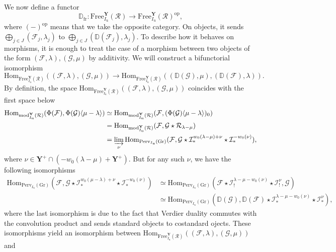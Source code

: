 \documentclass[11pt]{amsart}
\theoremstyle{plain}
\theoremstyle{remark}
\numberwithin{equation}{section}
\begin{document}
	We now define a functor 
	$$\mathbb{D}_{\mathrm{fr}}:\mathrm{Free}^\mathbf{Y}_{I_\mathrm{u}}(\mathcal{R})\to \mathrm{Free}^\mathbf{Y}_{I_\mathrm{u}}(\mathcal{R})^\mathrm{op},$$
 where $(-)^\mathrm{op}$ means that we take the opposite category. On objects, it sends $\bigoplus_{j\in J} (\mathcal{F}_j,\lambda_j)$ to $\bigoplus_{j\in J} (\mathbb{D}(\mathcal{F}_j),\lambda_j)$. To describe how it behaves on morphisms, it is enough to treat the case of a morphism between two objects of the form $(\mathcal{F},\lambda),(\mathcal{G},\mu)$ by additivity. We will construct a bifunctorial isomorphism  
 $$\mathrm{Hom}_{\mathrm{Free}^\mathbf{Y}_{I_\mathrm{u}}(\mathcal{R})}((\mathcal{F},\lambda),(\mathcal{G},\mu))\to \mathrm{Hom}_{\mathrm{Free}^\mathbf{Y}_{I_\mathrm{u}}(\mathcal{R})}((\mathbb{D}(\mathcal{G}),\mu),(\mathbb{D}(\mathcal{F}),\lambda)).$$  
 By definition, the space $\mathrm{Hom}_{\mathrm{Free}^\mathbf{Y}_{I_\mathrm{u}}(\mathcal{R})}((\mathcal{F},\lambda),(\mathcal{G},\mu))$ coincides with the first space below
	\begin{align*}
		\mathrm{Hom}_{\mathrm{mod}^\mathbf{Y}_{I_\mathrm{u}}(\mathcal{R})}(\Phi(\mathcal{F}),\Phi(\mathcal{G})\langle\mu-\lambda\rangle)&\simeq  \mathrm{Hom}_{\mathrm{mod}^\mathbf{Y}_{I_\mathrm{u}}(\mathcal{R})}(\mathcal{F},(\Phi(\mathcal{G})\langle\mu-\lambda\rangle)_0)\\
		&=\mathrm{Hom}_{\mathrm{mod}^\mathbf{Y}_{I_\mathrm{u}}(\mathcal{R})}(\mathcal{F},\mathcal{G}\star\mathcal{R}_{\lambda-\mu})\\
		&=\varinjlim_\nu\mathrm{Hom}_{\mathrm{Perv}_{I_\mathrm{u}}(\mathrm{Gr})}(\mathcal{F},\mathcal{G}\star\mathcal{I}^{w_0(\lambda-\mu)+\nu}_*\star\mathcal{I}^{-w_0(\nu)}_*),
	\end{align*}
	where $\nu\in \mathbf{Y}^+\cap(-w_0(\lambda-\mu)+\mathbf{Y}^+)$. But for any such $\nu$, we have the following isomorphisms
	\begin{align*}
		\mathrm{Hom}_{\mathrm{Perv}_{I_\mathrm{u}}(\mathrm{Gr})}(\mathcal{F},\mathcal{G}\star\mathcal{I}^{w_0(\mu-\lambda)+\nu}_*\star\mathcal{I}^{-w_0(\nu)}_*)&\simeq \mathrm{Hom}_{\mathrm{Perv}_{I_\mathrm{u}}(\mathrm{Gr})}(\mathcal{F}\star\mathcal{I}^{\lambda-\mu-w_0(\nu)}_!\star\mathcal{I}^{\nu}_!,\mathcal{G})\\
		&\simeq \mathrm{Hom}_{\mathrm{Perv}_{I_\mathrm{u}}(\mathrm{Gr})}(\mathbb{D}(\mathcal{G}),\mathbb{D}(\mathcal{F})\star\mathcal{I}^{\lambda-\mu-w_0(\nu)}_*\star\mathcal{I}^{\nu}_*),
	\end{align*}
	where the last isomorphism is due to the fact that Verdier duality commutes with the convolution product and sends standard objects to costandard ojects. These isomorphisms yield an isomorphism between $\mathrm{Hom}_{\mathrm{Free}^\mathbf{Y}_{I_\mathrm{u}}(\mathcal{R})}((\mathcal{F},\lambda),(\mathcal{G},\mu))$ and 
\end{document}
